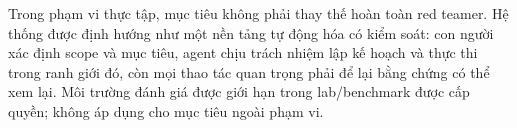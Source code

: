 Trong phạm vi thực tập, mục tiêu không phải thay thế hoàn toàn red teamer. Hệ thống được định hướng như một nền tảng tự động hóa có kiểm soát: con người xác định scope và mục tiêu, agent chịu trách nhiệm lập kế hoạch và thực thi trong ranh giới đó, còn mọi thao tác quan trọng phải để lại bằng chứng có thể xem lại. Môi trường đánh giá được giới hạn trong lab/benchmark được cấp quyền; không áp dụng cho mục tiêu ngoài phạm vi.

